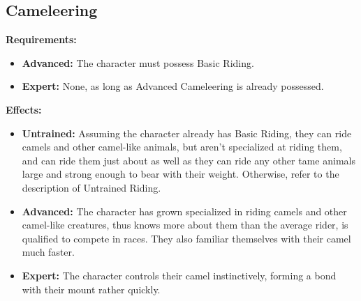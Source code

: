 \subsection{Cameleering}
\begin{table}[!ht]
\centering
{}
\end{table}
\textbf{Requirements:}
\begin{itemize}
	\item \textbf{Advanced:} The character must possess Basic Riding.
	\item \textbf{Expert:} None, as long as Advanced Cameleering is already possessed.
\end{itemize}
\textbf{Effects:}
\begin{itemize}
	\item \textbf{Untrained:} Assuming the character already has Basic Riding, they can ride camels and other camel-like animals, but aren't specialized at riding them, and can ride them just about as well as they can ride any other tame animals large and strong enough to bear with their weight. Otherwise, refer to the description of Untrained Riding.
	\item \textbf{Advanced:} The character has grown specialized in riding camels and other camel-like creatures, thus knows more about them than the average rider, is qualified to compete in races. They also familiar themselves with their camel much faster.
	\item \textbf{Expert:} The character controls their camel instinctively, forming a bond with their mount rather quickly.
\end{itemize}\newpage
